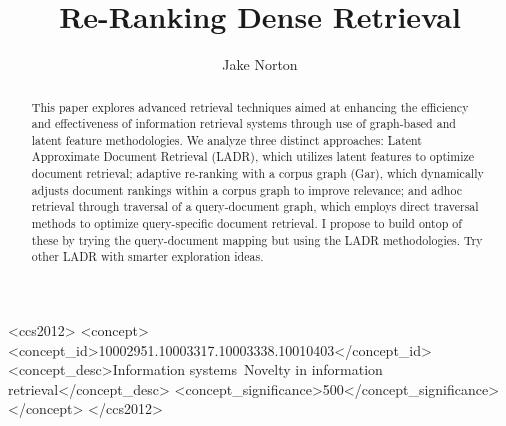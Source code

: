 \documentclass[sigconf,authorversion,nonacm]{acmart}
\begin{document}
\title{Re-Ranking Dense Retrieval}
\author{Jake Norton}



\begin{abstract}
	This paper explores advanced retrieval techniques aimed at enhancing the efficiency
	and effectiveness of information retrieval systems through use of graph-based and
	latent feature methodologies. We analyze three distinct approaches: Latent Approximate Document
	Retrieval (LADR), which utilizes latent features to optimize document retrieval; adaptive
	re-ranking with a corpus graph (Gar), which dynamically adjusts document rankings within a
	corpus graph to improve relevance; and adhoc retrieval through traversal of a query-document
	graph, which employs direct traversal methods to optimize query-specific document retrieval. I
	propose to build ontop of these by trying the query-document mapping but using the LADR
	methodologies. Try other LADR with smarter exploration ideas.


\end{abstract}


\begin{CCSXML} <ccs2012> <concept> <concept_id>10002951.10003317.10003338.10010403</concept_id>
	<concept_desc>Information systems~Novelty in information retrieval</concept_desc>
	<concept_significance>500</concept_significance> </concept> </ccs2012>
\end{CCSXML}


\maketitle
\end{document}
